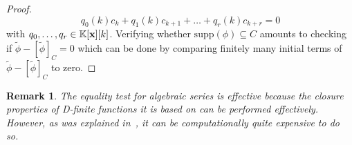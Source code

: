 \documentclass[a4paper,draft]{amsart}
\newtheorem{Remark}{Remark}
\newtheorem{Proposition}{Proposition}
\theoremstyle{definition}
\begin{document}
\begin{proof}
\begin{equation*}
q_0(k)c_k + q_1(k)c_{k+1} + \dots + q_r(k)c_{k+r} = 0
\end{equation*}
with $q_0,\dots,q_r \in \mathbb{K}[\bold{x}][k]$. Verifying whether $\mathrm{supp}(\phi) \subseteq C$ amounts to checking if $\tilde{\phi} - [\tilde{\phi}]_C = 0$ which can be done by comparing finitely many initial terms of $\tilde{\phi} - [\tilde{\phi}]_C$ to zero. 
\end{proof}

\begin{Remark}
The equality test for algebraic series is effective because the closure properties of D-finite functions it is based on can be performed effectively. However, as was explained in~\cite{bostan2017hypergeometric}, it can be computationally quite expensive to do so.
\end{Remark}

\end{document}
